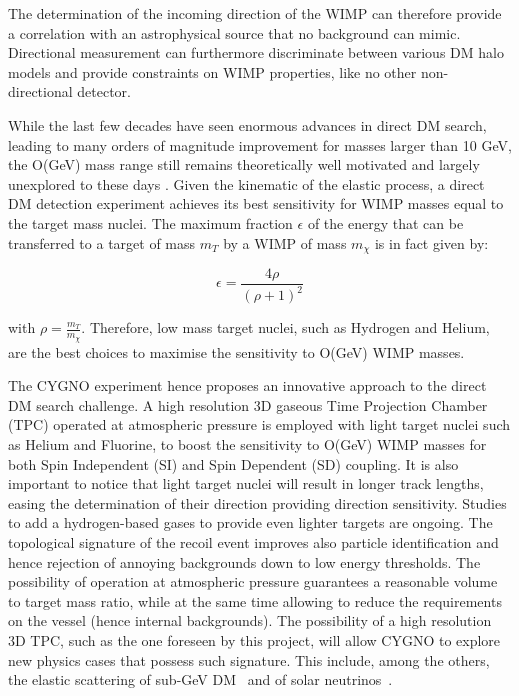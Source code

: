 \documentclass[physics,article,submit,moreauthors,pdftex]{Definitions/mdpi}
\begin{document}
The determination of the incoming direction of the WIMP can therefore provide a correlation with an astrophysical source \cite{Mayet:2016zxu} that no background can mimic. Directional measurement can furthermore discriminate between various DM halo models and provide constraints on WIMP properties, like no other non-directional detector\cite{Mayet:2016zxu}. 

While the last few decades have seen enormous advances in direct DM search, leading to many orders of magnitude improvement for masses larger than 10 GeV, the O(GeV) mass range still remains theoretically well motivated and largely unexplored to these days \cite{bib:zurek}.
Given the kinematic of the elastic process, a direct DM detection experiment achieves its best sensitivity for WIMP masses equal to the target mass nuclei. The maximum fraction $\epsilon$ of the energy that can be transferred to a target of mass $m_T$ by a WIMP of mass $m_{\chi}$ is in fact given by:

\begin{equation}
\epsilon = \frac {4 \rho}{\left( \rho + 1 \right)^2}
\label{eq:eps}
\end{equation}

with $\rho = \frac{m_T}{m_{\chi}}$. Therefore, low mass target nuclei, such as Hydrogen and Helium, are the best choices to maximise the sensitivity to O(GeV) WIMP masses. 



The CYGNO experiment hence proposes an innovative approach to the direct DM search challenge. A high resolution 3D gaseous Time Projection Chamber (TPC) operated at atmospheric pressure is employed with light target nuclei such as Helium and Fluorine, to boost the sensitivity to O(GeV) WIMP masses for both Spin Independent (SI) and Spin Dependent (SD) coupling. It is also important to notice that light target nuclei will result in longer track lengths, easing the determination of their direction providing direction sensitivity. Studies to add a hydrogen-based gases to provide even lighter targets are ongoing.
The topological signature of the recoil event improves also particle identification and hence rejection of annoying backgrounds down to low energy thresholds. The possibility of operation at atmospheric pressure  guarantees a reasonable volume to target mass ratio, while at the same time allowing to reduce the requirements on the vessel (hence internal backgrounds). 
The possibility of a high resolution 3D TPC, such as the one foreseen by this project,  will allow CYGNO to explore new physics cases that possess such signature. This include, among the others, the elastic scattering of sub-GeV DM~\cite{Baracchini:2020owr} and of solar neutrinos~\cite{Seguinot:1992zu,Arpesella:1996uc}.
\end{document}
